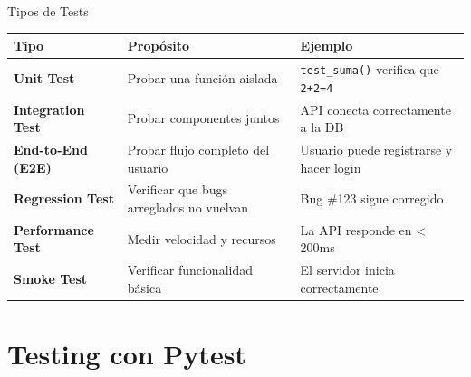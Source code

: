 \documentclass[aspectratio=169]{beamer}
\begin{document}
\begin{frame}{Tipos de Tests}
    \begin{table}[]
        \centering
        \renewcommand{\arraystretch}{1.3}
        \scriptsize
        \begin{tabular}{p{2.5cm} p{4.5cm} p{4.5cm}}
            \toprule
            \textbf{Tipo} & \textbf{Propósito} & \textbf{Ejemplo} \\
            \midrule
            \textbf{Unit Test} & Probar una función aislada & \texttt{test\_suma()} verifica que \texttt{2+2=4} \\
            \textbf{Integration Test} & Probar componentes juntos & API conecta correctamente a la DB \\
            \textbf{End-to-End (E2E)} & Probar flujo completo del usuario & Usuario puede registrarse y hacer login \\
            \textbf{Regression Test} & Verificar que bugs arreglados no vuelvan & Bug \#123 sigue corregido \\
            \textbf{Performance Test} & Medir velocidad y recursos & La API responde en < 200ms \\
            \textbf{Smoke Test} & Verificar funcionalidad básica & El servidor inicia correctamente \\
            \bottomrule
        \end{tabular}
    \end{table}
\end{frame}

\section{Testing con Pytest}
\end{document}
